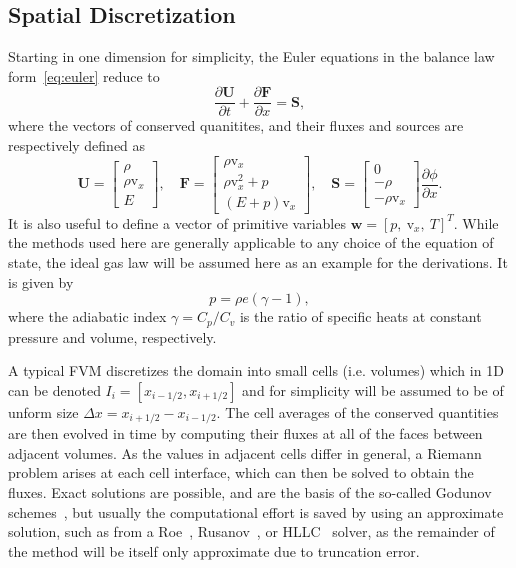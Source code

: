 \subsection{Spatial Discretization}
\label{subsec:space}

Starting in one dimension for simplicity, the Euler equations in the balance law form~\eqref{eq:euler} reduce to
\begin{equation} \label{eq:euler1D}
\frac{\partial \mathbf{U}}{\partial t}+\frac{\partial \mathbf{F}}{\partial x}=\mathbf{S},
\end{equation}
where the vectors of conserved quanitites, and their fluxes and sources are respectively defined as
\begin{equation}
\mathbf{U}=
\begin{bmatrix}
\rho \\ \rho \mathrm{v}_x \\ E
\end{bmatrix}
,\quad \mathbf{F}=
\begin{bmatrix}
\rho \mathrm{v}_x \\ \rho \mathrm{v}_x^2+p \\ (E+p)\mathrm{v}_x
\end{bmatrix}
,\quad \mathbf{S}=
\begin{bmatrix}
0 \\ -\rho \\ -\rho \mathrm{v}_x
\end{bmatrix} \frac{\partial \phi}{\partial x}.
\end{equation}
It is also useful to define a vector of primitive variables $\mathbf{w}=[p,\ \mathrm{v}_x,\ T]^T$. While the methods used here are generally applicable to any choice of the equation of state, the ideal gas law will be assumed here as an example for the derivations. It is given by
\begin{equation}
p=\rho e(\gamma-1),
\end{equation}
where the adiabatic index $\gamma=C_p/C_v$ is the ratio of specific heats at constant pressure and volume, respectively.

A typical FVM discretizes the domain into small cells (i.e. volumes) which in 1D can be denoted $I_i=[x_{i-1/2},x_{i+1/2}]$ and for simplicity will be assumed to be of unform size $\Delta x=x_{i+1/2}-x_{i-1/2}$. The cell averages of the conserved quantities are then evolved in time by computing their fluxes at all of the faces between adjacent volumes. As the values in adjacent cells differ in general, a Riemann problem arises at each cell interface, which can then be solved to obtain the fluxes. Exact solutions are possible, and are the basis of the so-called Godunov schemes~\cite{Godunov1959}, but usually the computational effort is saved by using an approximate solution, such as from a Roe~\cite{Roe1981}, Rusanov~\cite{Rusanov1961}, or HLLC~\cite{Toro1994} solver, as the remainder of the method will be itself only approximate due to truncation error.

